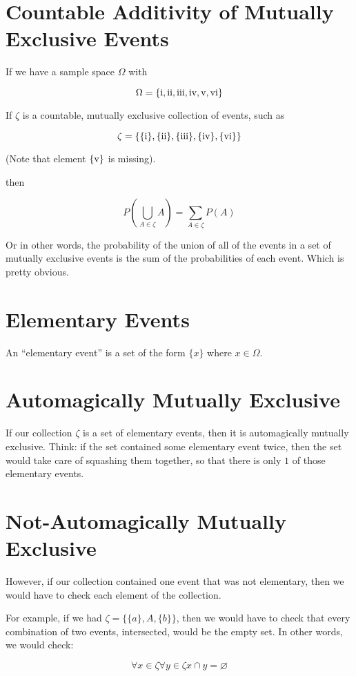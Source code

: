 \documentclass{article}
\newcommand{\RN}[1]{\textrm{\uppercase\expandafter{\romannumeral #1\relax}}}
\begin{document}
\section*{Countable Additivity of Mutually Exclusive Events}

If we have a sample space $\Omega$ with

\[
\Omega=\left\{\RN{1}, \RN{2}, \RN{3}, \RN{4}, \RN{5}, \RN{6}\right\}
\]

If $\zeta$ is a countable, mutually exclusive collection of events, such as

\[
\zeta=\left\{
\{\RN{1}\},
\{\RN{2}\},
\{\RN{3}\},
\{\RN{4}\},
\{\RN{6}\}
\right\}
\]

(Note that element $\{\RN{5}\}$ is missing).

then

\[
P\left(\bigcup_{A\in{}\zeta} A\right) = \sum\limits_{A\in{}\zeta} P(A)
\]

Or in other words, the probability of the union of all of the events
in a set of mutually exclusive events is the sum of the probabilities
of each event. Which is pretty obvious.

\section*{Elementary Events}

An ``elementary event'' is a set of the form $\{x\}$ where
$x\in{}\Omega$.

\section*{Automagically Mutually Exclusive}

If our collection $\zeta$ is a set of elementary events, then it is
automagically mutually exclusive. Think: if the set contained some
elementary event twice, then the set would take care of squashing them
together, so that there is only $1$ of those elementary events.

\section*{Not-Automagically Mutually Exclusive}

However, if our collection contained one event that was not
elementary, then we would have to check each element of the
collection.

For example, if we had $\zeta=\{\{a\}, A, \{b\}\}$, then we would have
to check that every combination of two events, intersected, would be
the empty set. In other words, we would check:

\[
\forall x\in\zeta\! \forall y\in\zeta\! x\cap y=\varnothing
\]
\end{document}
